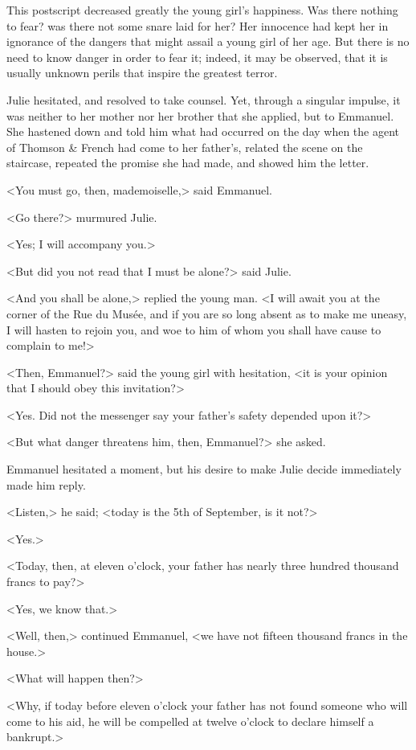  This postscript decreased greatly the young girl's happiness. Was there nothing to fear? was there not some snare laid for her? Her innocence had kept her in ignorance of the dangers that might assail a young girl of her age. But there is no need to know danger in order to fear it; indeed, it may be observed, that it is usually unknown perils that inspire the greatest terror. 

 Julie hesitated, and resolved to take counsel. Yet, through a singular impulse, it was neither to her mother nor her brother that she applied, but to Emmanuel. She hastened down and told him what had occurred on the day when the agent of Thomson \& French had come to her father's, related the scene on the staircase, repeated the promise she had made, and showed him the letter. 

 <You must go, then, mademoiselle,> said Emmanuel. 

 <Go there?> murmured Julie. 

 <Yes; I will accompany you.> 

 <But did you not read that I must be alone?> said Julie. 

 <And you shall be alone,> replied the young man. <I will await you at the corner of the Rue du Musée, and if you are so long absent as to make me uneasy, I will hasten to rejoin you, and woe to him of whom you shall have cause to complain to me!> 

 <Then, Emmanuel?> said the young girl with hesitation, <it is your opinion that I should obey this invitation?> 

 <Yes. Did not the messenger say your father's safety depended upon it?> 

 <But what danger threatens him, then, Emmanuel?> she asked. 

 Emmanuel hesitated a moment, but his desire to make Julie decide immediately made him reply. 

 <Listen,> he said; <today is the 5th of September, is it not?> 

 <Yes.> 

 <Today, then, at eleven o'clock, your father has nearly three hundred thousand francs to pay?> 

 <Yes, we know that.> 

 <Well, then,> continued Emmanuel, <we have not fifteen thousand francs in the house.> 

 <What will happen then?> 

 <Why, if today before eleven o'clock your father has not found someone who will come to his aid, he will be compelled at twelve o'clock to declare himself a bankrupt.> 

